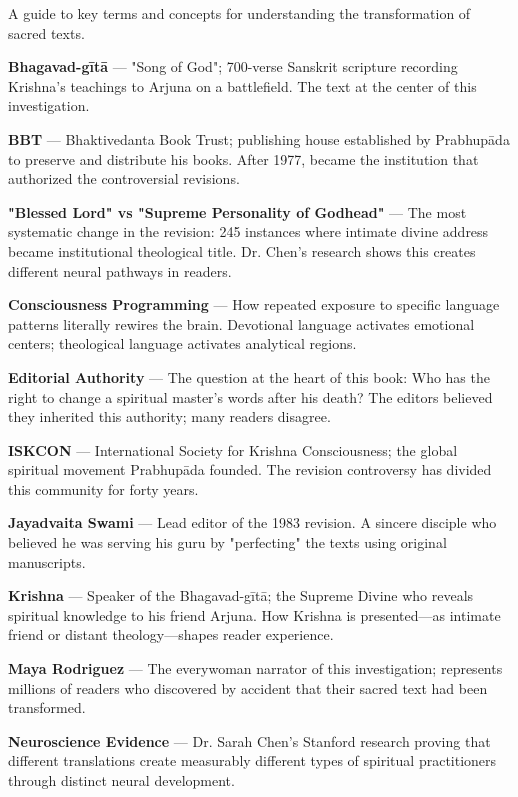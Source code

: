 \documentclass[11pt,twoside]{book}
\begin{document}
A guide to key terms and concepts for understanding the transformation of sacred texts.

\textbf{\textbf{Bhagavad-gītā}} — "Song of God"; 700-verse Sanskrit scripture recording Krishna's teachings to Arjuna on a battlefield. The text at the center of this investigation.

\textbf{\textbf{BBT}} — Bhaktivedanta Book Trust; publishing house established by Prabhupāda to preserve and distribute his books. After 1977, became the institution that authorized the controversial revisions.

\textbf{\textbf{"Blessed Lord" vs "Supreme Personality of Godhead"}} — The most systematic change in the revision: 245 instances where intimate divine address became institutional theological title. Dr. Chen's research shows this creates different neural pathways in readers.

\textbf{\textbf{Consciousness Programming}} — How repeated exposure to specific language patterns literally rewires the brain. Devotional language activates emotional centers; theological language activates analytical regions.

\textbf{\textbf{Editorial Authority}} — The question at the heart of this book: Who has the right to change a spiritual master's words after his death? The editors believed they inherited this authority; many readers disagree.

\textbf{\textbf{ISKCON}} — International Society for Krishna Consciousness; the global spiritual movement Prabhupāda founded. The revision controversy has divided this community for forty years.

\textbf{\textbf{Jayadvaita Swami}} — Lead editor of the 1983 revision. A sincere disciple who believed he was serving his guru by "perfecting" the texts using original manuscripts.

\textbf{\textbf{Krishna}} — Speaker of the Bhagavad-gītā; the Supreme Divine who reveals spiritual knowledge to his friend Arjuna. How Krishna is presented—as intimate friend or distant theology—shapes reader experience.

\textbf{\textbf{Maya Rodriguez}} — The everywoman narrator of this investigation; represents millions of readers who discovered by accident that their sacred text had been transformed.

\textbf{\textbf{Neuroscience Evidence}} — Dr. Sarah Chen's Stanford research proving that different translations create measurably different types of spiritual practitioners through distinct neural development.
\end{document}
